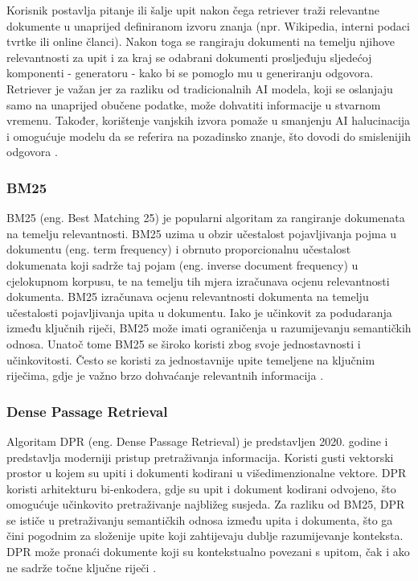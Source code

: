 \documentclass[]{foi}
\begin{document}
Korisnik postavlja pitanje ili šalje upit nakon čega retriever traži relevantne dokumente u unaprijed definiranom izvoru znanja (npr. Wikipedia, interni podaci tvrtke ili online članci).
Nakon toga se rangiraju dokumenti na temelju njihove relevantnosti za upit i za kraj se odabrani dokumenti prosljeđuju sljedećoj komponenti - generatoru - kako bi se pomoglo mu u generiranju odgovora.
Retriever je važan jer za razliku od tradicionalnih AI modela, koji se oslanjaju samo na unaprijed obučene podatke, može dohvatiti informacije u stvarnom vremenu. Također, korištenje 
vanjskih izvora pomaže u smanjenju AI halucinacija i omogućuje modelu da se referira na pozadinsko znanje, što dovodi do smislenijih odgovora \cite{shaheryar2025}.

\subsubsection{BM25}
BM25 (eng. Best Matching 25) je popularni algoritam za rangiranje dokumenata na temelju relevantnosti. BM25 uzima u obzir učestalost pojavljivanja pojma u dokumentu 
(eng. term frequency) i obrnuto proporcionalnu učestalost dokumenata koji sadrže taj pojam (eng. inverse document frequency) u cjelokupnom korpusu, te na temelju tih 
mjera izračunava ocjenu relevantnosti dokumenta.
BM25 izračunava ocjenu relevantnosti dokumenta na temelju učestalosti pojavljivanja upita u dokumentu. Iako je učinkovit za podudaranja
između ključnih riječi, BM25 može imati ograničenja u razumijevanju semantičkih odnosa. Unatoč tome BM25 se široko koristi zbog svoje jednostavnosti
i učinkovitosti. Često se koristi za jednostavnije upite temeljene na ključnim riječima, gdje je važno brzo dohvaćanje relevantnih informacija \cite{gupta2024rag}.

\subsubsection{Dense Passage Retrieval}
Algoritam DPR (eng. Dense Passage Retrieval) je predstavljen 2020. godine i predstavlja moderniji pristup pretraživanja informacija. Koristi gusti
vektorski prostor u kojem su upiti i dokumenti kodirani u višedimenzionalne vektore. DPR koristi arhitekturu bi-enkodera, gdje su upit 
i dokument kodirani odvojeno, što omogućuje učinkovito pretraživanje najbližeg susjeda. Za razliku od BM25, DPR se ističe u pretraživanju
semantičkih odnosa između upita i dokumenta, što ga čini pogodnim za složenije upite koji zahtijevaju dublje razumijevanje konteksta. DPR može
pronaći dokumente koji su kontekstualno povezani s upitom, čak i ako ne sadrže točne ključne riječi \cite{gupta2024rag}.
\end{document}
